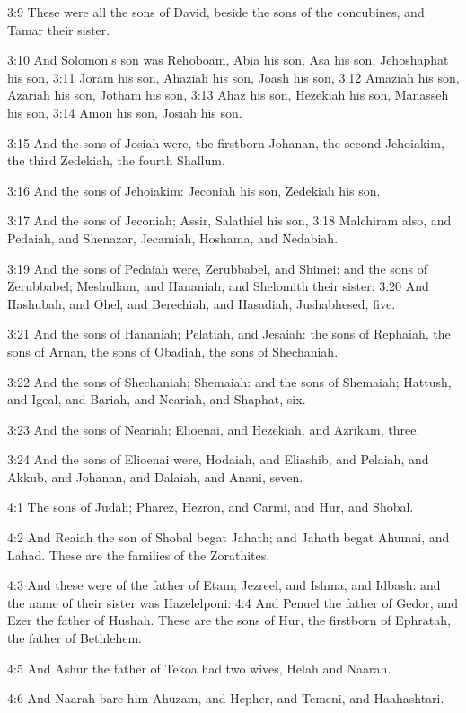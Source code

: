 3:9 These were all the sons of David, beside the sons of the
concubines, and Tamar their sister.

3:10 And Solomon's son was Rehoboam, Abia his son, Asa his son,
Jehoshaphat his son, 3:11 Joram his son, Ahaziah his son, Joash his
son, 3:12 Amaziah his son, Azariah his son, Jotham his son, 3:13 Ahaz
his son, Hezekiah his son, Manasseh his son, 3:14 Amon his son, Josiah
his son.

3:15 And the sons of Josiah were, the firstborn Johanan, the second
Jehoiakim, the third Zedekiah, the fourth Shallum.

3:16 And the sons of Jehoiakim: Jeconiah his son, Zedekiah his son.

3:17 And the sons of Jeconiah; Assir, Salathiel his son, 3:18
Malchiram also, and Pedaiah, and Shenazar, Jecamiah, Hoshama, and
Nedabiah.

3:19 And the sons of Pedaiah were, Zerubbabel, and Shimei: and the
sons of Zerubbabel; Meshullam, and Hananiah, and Shelomith their
sister: 3:20 And Hashubah, and Ohel, and Berechiah, and Hasadiah,
Jushabhesed, five.

3:21 And the sons of Hananiah; Pelatiah, and Jesaiah: the sons of
Rephaiah, the sons of Arnan, the sons of Obadiah, the sons of
Shechaniah.

3:22 And the sons of Shechaniah; Shemaiah: and the sons of Shemaiah;
Hattush, and Igeal, and Bariah, and Neariah, and Shaphat, six.

3:23 And the sons of Neariah; Elioenai, and Hezekiah, and Azrikam,
three.

3:24 And the sons of Elioenai were, Hodaiah, and Eliashib, and
Pelaiah, and Akkub, and Johanan, and Dalaiah, and Anani, seven.

4:1 The sons of Judah; Pharez, Hezron, and Carmi, and Hur, and Shobal.

4:2 And Reaiah the son of Shobal begat Jahath; and Jahath begat
Ahumai, and Lahad. These are the families of the Zorathites.

4:3 And these were of the father of Etam; Jezreel, and Ishma, and
Idbash: and the name of their sister was Hazelelponi: 4:4 And Penuel
the father of Gedor, and Ezer the father of Hushah. These are the sons
of Hur, the firstborn of Ephratah, the father of Bethlehem.

4:5 And Ashur the father of Tekoa had two wives, Helah and Naarah.

4:6 And Naarah bare him Ahuzam, and Hepher, and Temeni, and
Haahashtari.

